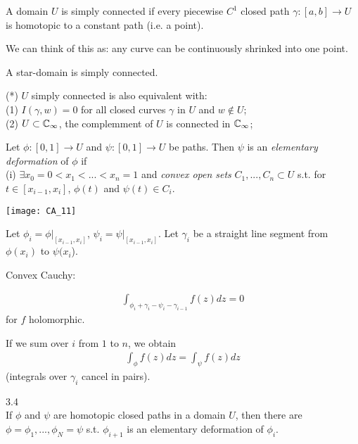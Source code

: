 \documentclass[a4paper]{article}
\begin{document}
\begin{defi}
A domain $U$ is simply connected if every piecewise $C^1$ closed path $\gamma:[a,b] \to U$ is homotopic to a constant path (i.e. a point).

We can think of this as: any curve can be continuously shrinked into one point.
\end{defi}

\begin{rem}
A star-domain is simply connected.
\end{rem}

\begin{rem} (*)
$U$ simply connected is also equivalent with:\\
(1) $I(\gamma,w) = 0$ for all closed curves $\gamma$ in $U$ and $w \not\in U$;\\
(2) $U \subset \mathbb{C}_\infty$, the complemment of $U$ is connected in $\mathbb{C}_\infty$;
\end{rem}

\begin{defi}
Let $\phi:[0,1] \to U$ and $\psi: [0,1] \to U$ be paths. Then $\psi$ is an \emph{elementary deformation} of $\phi$ if\\
(i) $\exists x_0 = 0<x_1 < ... < x_n = 1$ and \emph{convex open sets} $C_1,...,C_n \subset U$ s.t. for $t \in [x_{i-1},x_i]$, $\phi(t)$ and $\psi(t) \in C_i$.

\texttt{[image: CA\_11]}
\end{defi}

Let $\phi_i = \phi|_{[x_{i-1},x_i]}$, $\psi_i = \psi|_{[x_{i-1},x_i]}$. Let $\gamma_i$ be a straight line segment from $\phi(x_i)$ to $\psi(x_i$).

Convex Cauchy:

\begin{equation*}
\begin{aligned}
\int_{\phi_i+\gamma_i - \psi_i - \gamma_{i-1}} f(z)dz = 0
\end{aligned}
\end{equation*}
for $f$ holomorphic.

If we sum over $i$ from $1$ to $n$, we obtain
\begin{equation*}
\begin{aligned}
\int_\phi f(z) dz = \int_\psi f(z) dz
\end{aligned}
\end{equation*}
(integrals over $\gamma_i$ cancel in pairs).

\begin{prop} 3.4\\
If $\phi$ and $\psi$ are homotopic closed paths in a domain $U$, then there are $\phi = \phi_1,...,\phi_N = \psi$ s.t. $\phi_{i+1}$ is an elementary deformation of $\phi_i$.
\end{prop}
\end{document}
